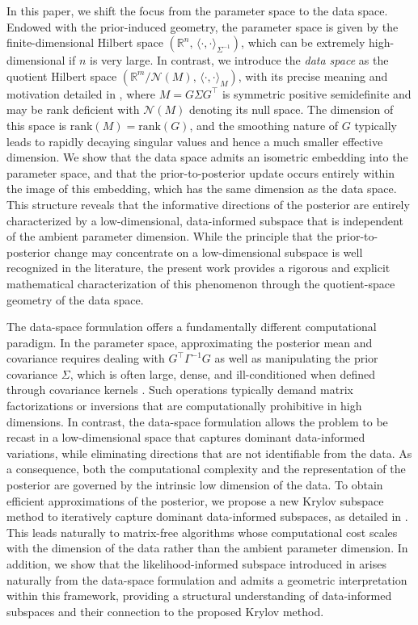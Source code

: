 \documentclass[]{myarticle}
\begin{document}
In this paper, we shift the focus from the parameter space to the data space. Endowed with the prior-induced geometry, the parameter space is given by the finite-dimensional Hilbert space $(\mathbb{R}^{n},\,\langle \cdot,\cdot \rangle_{\Sigma^{-1}})$, which can be extremely high-dimensional if $n$ is very large. In contrast, we introduce the \emph{data space} as the quotient Hilbert space $(\mathbb R^m/\mathcal N(M),\,\langle\cdot,\cdot\rangle_M)$, with its precise meaning and motivation detailed in , where $M = G\Sigma G^\top$ is symmetric positive semidefinite and may be rank deficient with $\mathcal{N}(M)$ denoting its null space. The dimension of this space is $\mathrm{rank}(M)=\mathrm{rank}(G)$, and the smoothing nature of $G$ typically leads to rapidly decaying singular values and hence a much smaller effective dimension. We show that the data space admits an isometric embedding into the parameter space, and that the prior-to-posterior update occurs entirely within the image of this embedding, which has the same  dimension as the data space. This structure reveals that the informative directions of the posterior are entirely characterized by a low-dimensional, data-informed subspace that is independent of the ambient parameter dimension. While the principle that the prior-to-posterior change may concentrate on a low-dimensional subspace is well recognized in the literature, the present work provides a rigorous and explicit mathematical characterization of this phenomenon through the quotient-space geometry of the data space.

The data-space formulation offers a fundamentally different computational paradigm. In the parameter space, approximating the posterior mean and covariance requires dealing with $G^\top \Gamma^{-1} G$ as well as manipulating the prior covariance $\Sigma$, which is often large, dense, and ill-conditioned when defined through covariance kernels \cite{Williams2006gaussian,Roininen2014whittle}. Such operations typically demand matrix factorizations or inversions that are computationally prohibitive in high dimensions. In contrast, the data-space formulation allows the problem to be recast in a low-dimensional space that captures dominant data-informed variations, while eliminating directions that are not identifiable from the data. As a consequence, both the computational complexity and the representation of the posterior are governed by the intrinsic low dimension of the data. To obtain efficient approximations of the posterior, we propose a new Krylov subspace method \cite{liesen2013krylov} to iteratively capture dominant data-informed subspaces, as detailed in . This leads naturally to matrix-free algorithms whose computational cost scales with the dimension of the data rather than the ambient parameter dimension. In addition, we show that the likelihood-informed subspace introduced in \cite{spantini2015optimal} arises naturally from the data-space formulation and admits a geometric interpretation within this framework, providing a structural understanding of data-informed subspaces and their connection to the proposed Krylov method.
\end{document}
